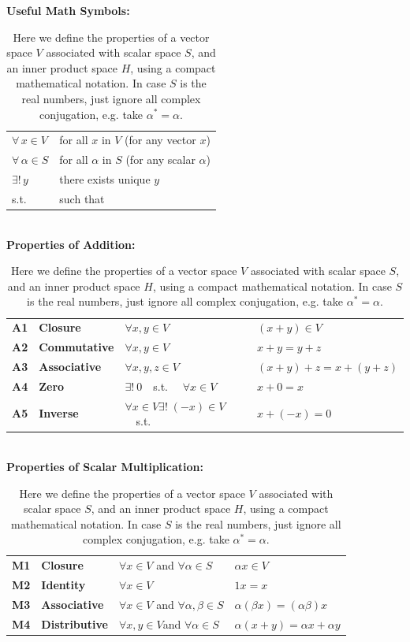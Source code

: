 \documentclass[12pt]{book}
\begin{document}
\begin{table}
\caption{ \label{tbl:ipspace} Here we define the properties of a vector space $V$ associated with scalar space $S$, and an inner product space $H$, using a compact mathematical notation.  In case $S$ is the real numbers, just ignore all complex conjugation, e.g. take $\alpha^* = \alpha$.}
\begin{center}
{\bf Useful Math Symbols:}\\
\begin{tabular}{ll}
  $\forall \, x \in V$ & for all $x$ in $V$ (for any vector $x$)\\
  $\forall \, \alpha \in S$ & for all $\alpha$ in $S$ (for any scalar $\alpha$) \\
  $\exists ! \, y$ & there exists unique $y$ \\
  s.t.          & such that \\
\end{tabular}\\    
\vskip 0.5cm
{\bf Properties of Addition:}\\
\begin{tabular}{llll}
{\bf A1} & {\bf Closure} & $\forall x,y \in V$ & $(x+y) \in V $\\
{\bf A2} & {\bf Commutative} & $\forall x,y \in V$ & $x+y=y+z$\\
{\bf A3} & {\bf Associative} & $\forall x,y,z \in V$ & $(x+y)+z = x+(y+z)$\\
{\bf A4} & {\bf Zero}        & $\exists !~0$~~s.t.~~ $\forall x \in V$ & $x+0 = x$ \\
{\bf A5} & {\bf Inverse} & $\forall x \in V \exists !\;(-x) \in V$~~s.t.~~& $x+(-x)=0$\\
\end{tabular} \\
\vskip 0.5cm
{\bf Properties of Scalar Multiplication:}\\
\begin{tabular}{llll}
  {\bf M1} & {\bf Closure} & $\forall x \in V$ and $\forall \alpha \in S$ & $\alpha x \in V$\\
  {\bf M2} & {\bf Identity} & $\forall x \in V$ & $1x=x$\\
  {\bf M3} & {\bf Associative} & $\forall x \in V$
and $\forall \alpha,\beta \in S$ & $\alpha(\beta x) = (\alpha \beta) x$\\
{\bf M4} & {\bf Distributive} & $\forall x,y \in V$and $\forall \alpha \in S$ & $\alpha(x+y) = \alpha x + \alpha y$ \\

\end{tabular}
\end{center}
\end{table}
\end{document}
